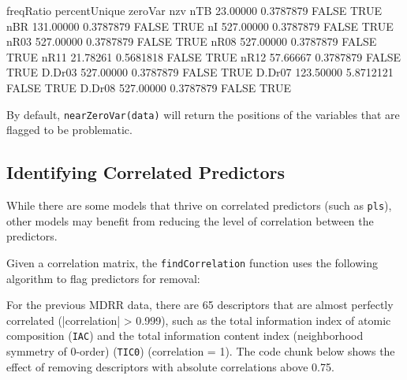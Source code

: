 \documentclass[12pt]{article}
\begin{document}
\begin{small}
\begin{Schunk}
\begin{Soutput}
       freqRatio percentUnique zeroVar  nzv
nTB     23.00000     0.3787879   FALSE TRUE
nBR    131.00000     0.3787879   FALSE TRUE
nI     527.00000     0.3787879   FALSE TRUE
nR03   527.00000     0.3787879   FALSE TRUE
nR08   527.00000     0.3787879   FALSE TRUE
nR11    21.78261     0.5681818   FALSE TRUE
nR12    57.66667     0.3787879   FALSE TRUE
D.Dr03 527.00000     0.3787879   FALSE TRUE
D.Dr07 123.50000     5.8712121   FALSE TRUE
D.Dr08 527.00000     0.3787879   FALSE TRUE
\end{Soutput}
\end{Schunk}
\end{small}


By default, \texttt{nearZeroVar(data)} will return the positions of the variables that are flagged to be problematic.

\subsection{Identifying Correlated Predictors}

While there are some models that thrive on correlated predictors (such as \texttt{pls}), other models may benefit from reducing the level of correlation between the predictors. 

Given a correlation matrix, the \texttt{findCorrelation} function uses the following algorithm to flag predictors for removal:

\begin{algorithm}[H]
	\SetLine
\end{algorithm}


For the previous MDRR data, there are 65 descriptors that are almost perfectly correlated (|correlation| > 0.999), such as the total information index of atomic composition (\texttt{IAC}) and the total information content index (neighborhood symmetry of 0-order) (\texttt{TIC0}) (correlation = 1). The code chunk below shows the effect of removing descriptors with absolute correlations above 0.75.
\end{document}

